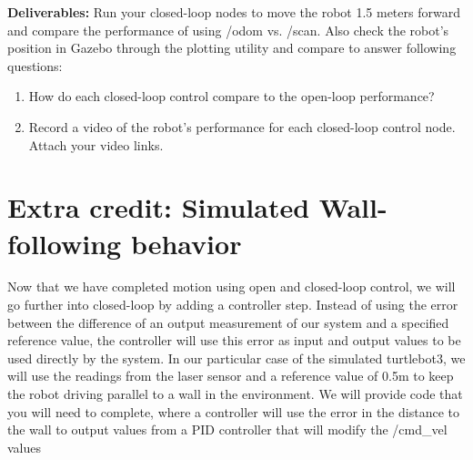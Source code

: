 \documentclass[12pt]{article}
\begin{document}
\textbf{Deliverables:}
Run your closed-loop nodes to move the robot 1.5 meters forward and compare the performance of using /odom vs. /scan. Also check the robot’s position in Gazebo through the plotting utility and compare to answer following questions:
\begin{enumerate}
    \item How do each closed-loop control compare to the open-loop performance?
    \item Record a video of the robot’s performance for each closed-loop control node. Attach your video links.
\end{enumerate}

\section{Extra credit: Simulated Wall-following behavior}
Now that we have completed motion using open and closed-loop control, we will go further into closed-loop by adding a controller step. Instead of using the error between the difference of an output measurement of our system and a specified reference value, the controller will use this error as input and output values to be used directly by the system. In our particular case of the simulated turtlebot3, we will use the readings from the laser sensor and a reference value of 0.5m to keep the robot driving parallel to a wall in the environment. 
We will provide code that you will need to complete, where a controller will use the error in the distance to the wall to output values from a PID controller that will modify the /cmd\_vel values
\end{document}
